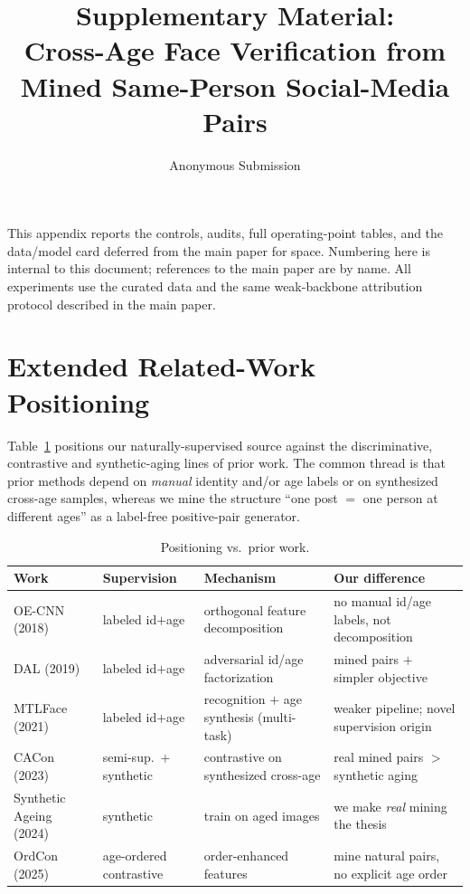 \documentclass[letterpaper]{article} %
\title{Supplementary Material:\\ Cross-Age Face Verification from Mined Same-Person Social-Media Pairs}
\author{
    Anonymous Submission
}
\begin{document}
\maketitle

\noindent This appendix reports the controls, audits, full operating-point tables, and the data/model card deferred from the main paper for space. Numbering here is internal to this document; references to the main paper are by name. All experiments use the curated data and the same weak-backbone attribution protocol described in the main paper.

\section{Extended Related-Work Positioning}\label{sup:positioning}
Table~\ref{tab:positioning} positions our naturally-supervised source against the discriminative, contrastive and synthetic-aging lines of prior work. The common thread is that prior methods depend on \emph{manual} identity and/or age labels or on synthesized cross-age samples, whereas we mine the structure ``one post $=$ one person at different ages'' as a label-free positive-pair generator.

\begin{table}[t]
\centering
\small
\begin{tabular}{@{}p{}p{}p{}p{}@{}}
\toprule
Work & Supervision & Mechanism & Our difference \\
\midrule
OE-CNN (2018)~\cite{wang2018oecnn} & labeled id$+$age & orthogonal feature decomposition & no manual id/age labels, not decomposition \\
DAL (2019)~\cite{wang2019dal} & labeled id$+$age & adversarial id/age factorization & mined pairs $+$ simpler objective \\
MTLFace (2021)~\cite{huang2021mtlface} & labeled id$+$age & recognition $+$ age synthesis (multi-task) & weaker pipeline; novel supervision origin \\
CACon (2023)~\cite{wang2024cacon} & semi-sup.\ $+$ synthetic & contrastive on synthesized cross-age & real mined pairs $>$ synthetic aging \\
Synthetic Ageing (2024)~\cite{yao2024synthageing} & synthetic & train on aged images & we make \emph{real} mining the thesis \\
OrdCon (2025)~\cite{wang2025ordcon} & age-ordered contrastive & order-enhanced features & mine natural pairs, no explicit age order \\
\bottomrule
\end{tabular}
\caption{Positioning vs.\ prior work.}
\label{tab:positioning}
\end{table}
\end{document}
